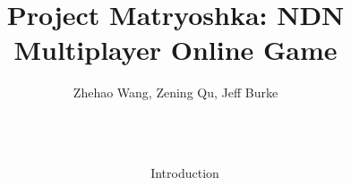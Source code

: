 \documentclass[final,hyperref={pdfpagelabels=false},20pt]{beamer}
\title{\huge Project Matryoshka: NDN Multiplayer Online Game}
\author[AuthorNames]{Zhehao Wang\inst{1}, Zening Qu\inst{2}, Jeff Burke\inst{3}}
\institute[Institutes]{\inst{1} \inst{2} \inst{3} UCLA REMAP}
\begin{document}

\begin{frame}[t] %

\begin{columns}[t] %

\begin{column}{.02\textwidth}\end{column} %

\begin{column}{.465\textwidth} %


\begin{block}{Introduction}


\end{block}
\end{column}
\end{columns}
\end{frame}
\end{document}
